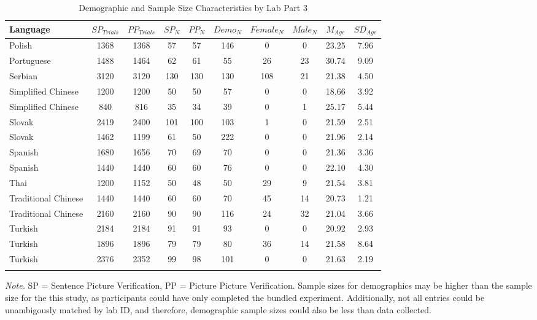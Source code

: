 \documentclass[
  man,mask,floatsintext]{apa7}
\begin{document}
\begin{table}[tbp]

\begin{center}
\begin{threeparttable}

\caption{\label{tab:print-part3}Demographic and Sample Size Characteristics by Lab Part 3}

\footnotesize{

\begin{tabular}{lccccccccc}
\toprule
Language & $SP_{Trials}$ & $PP_{Trials}$ & $SP_N$ & $PP_N$ & $Demo_N$ & $Female_N$ & $Male_N$ & $M_{Age}$ & $SD_{Age}$\\
\midrule
Polish & 1368 & 1368 & 57 & 57 & 146 & 0 & 0 & 23.25 & 7.96\\
Portuguese & 1488 & 1464 & 62 & 61 & 55 & 26 & 23 & 30.74 & 9.09\\
Serbian & 3120 & 3120 & 130 & 130 & 130 & 108 & 21 & 21.38 & 4.50\\
Simplified Chinese & 1200 & 1200 & 50 & 50 & 57 & 0 & 0 & 18.66 & 3.92\\
Simplified Chinese & 840 & 816 & 35 & 34 & 39 & 0 & 1 & 25.17 & 5.44\\
Slovak & 2419 & 2400 & 101 & 100 & 103 & 1 & 0 & 21.59 & 2.51\\
Slovak & 1462 & 1199 & 61 & 50 & 222 & 0 & 0 & 21.96 & 2.14\\
Spanish & 1680 & 1656 & 70 & 69 & 70 & 0 & 0 & 21.36 & 3.36\\
Spanish & 1440 & 1440 & 60 & 60 & 76 & 0 & 0 & 22.10 & 4.30\\
Thai & 1200 & 1152 & 50 & 48 & 50 & 29 & 9 & 21.54 & 3.81\\
Traditional Chinese & 1440 & 1440 & 60 & 60 & 70 & 45 & 14 & 20.73 & 1.21\\
Traditional Chinese & 2160 & 2160 & 90 & 90 & 116 & 24 & 32 & 21.04 & 3.66\\
Turkish & 2184 & 2184 & 91 & 91 & 93 & 0 & 0 & 20.92 & 2.93\\
Turkish & 1896 & 1896 & 79 & 79 & 80 & 36 & 14 & 21.58 & 8.64\\
Turkish & 2376 & 2352 & 99 & 98 & 101 & 0 & 0 & 21.63 & 2.19\\
\bottomrule
\addlinespace
\end{tabular}

}

\begin{tablenotes}[para]
\normalsize{\textit{Note.} SP = Sentence Picture Verification, PP = Picture Picture Verification. Sample sizes for demographics may be higher than the sample size for the this study, as participants could have only completed the bundled experiment. Additionally, not all entries could be unambigously matched by lab ID, and therefore, demographic sample sizes could also be less than data collected.}
\end{tablenotes}

\end{threeparttable}
\end{center}

\end{table}
\end{document}
